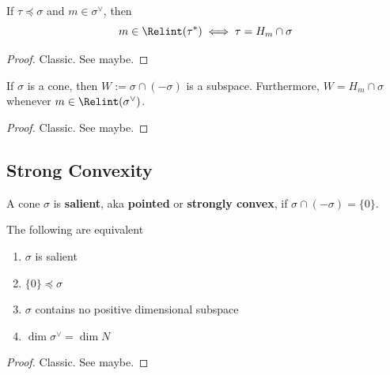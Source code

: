 \begin{lemma}
  \label{1-2-rel-interior-dual-face}

  If $\tau \preceq \sigma$ and $m \in \sigma^\vee$, then
  $$m \in \Relint(\tau^*) \iff \tau = H_m \cap \sigma$$
\end{lemma}
\begin{proof}

  Classic. See \cite{Oda_1988} maybe.
\end{proof}


\begin{lemma}
  \label{1-2-min-face}

  If $\sigma$ is a cone, then $W := \sigma \cap (-\sigma)$ is a subspace. Furthermore,
  $W = H_m \cap \sigma$ whenever $m \in \Relint(\sigma^\vee)$.
\end{lemma}
\begin{proof}

  Classic. See \cite{Oda_1988} maybe.
\end{proof}


\subsection{Strong Convexity}


\begin{definition}
  \label{1-2-12-salient-cone}
  \leanok

  A cone $\sigma$ is {\bf salient}, aka {\bf pointed} or {\bf strongly convex}, if $\sigma \cap (-\sigma) = \{0\}$.
\end{definition}


\begin{proposition}
  \label{1-2-12-salient-cone-tfae}

  The following are equivalent
  \begin{enumerate}
    \item $\sigma$ is salient
    \item $\{0\} \preceq \sigma$
    \item $\sigma$ contains no positive dimensional subspace
    \item $\dim \sigma^\vee = \dim N$
  \end{enumerate}
\end{proposition}
\begin{proof}

  Classic. See \cite{Oda_1988} maybe.
\end{proof}


